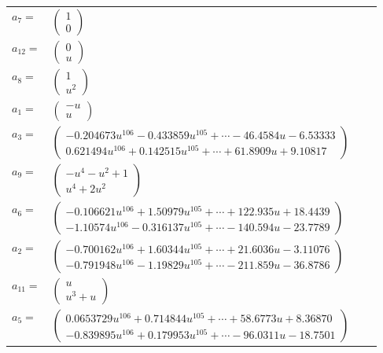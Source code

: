 \documentclass[1p]{elsarticle_modified}
\theoremstyle{definition}
\begin{document}
\begin{tabular}{m{7pt} m{180pt} m{7pt} m{180pt} }
\flushright $a_{7}=$&$\begin{pmatrix}1\\0\end{pmatrix}$ \\
\flushright $a_{12}=$&$\begin{pmatrix}0\\u\end{pmatrix}$ \\
\flushright $a_{8}=$&$\begin{pmatrix}1\\u^2\end{pmatrix}$ \\
\flushright $a_{1}=$&$\begin{pmatrix}- u\\u\end{pmatrix}$ \\
\flushright $a_{3}=$&$\begin{pmatrix}-0.204673 u^{106}-0.433859 u^{105}+\cdots-46.4584 u-6.53333\\0.621494 u^{106}+0.142515 u^{105}+\cdots+61.8909 u+9.10817\end{pmatrix}$ \\
\flushright $a_{9}=$&$\begin{pmatrix}- u^4- u^2+1\\u^4+2 u^2\end{pmatrix}$ \\
\flushright $a_{6}=$&$\begin{pmatrix}-0.106621 u^{106}+1.50979 u^{105}+\cdots+122.935 u+18.4439\\-1.10574 u^{106}-0.316137 u^{105}+\cdots-140.594 u-23.7789\end{pmatrix}$ \\
\flushright $a_{2}=$&$\begin{pmatrix}-0.700162 u^{106}+1.60344 u^{105}+\cdots+21.6036 u-3.11076\\-0.791948 u^{106}-1.19829 u^{105}+\cdots-211.859 u-36.8786\end{pmatrix}$ \\
\flushright $a_{11}=$&$\begin{pmatrix}u\\u^3+u\end{pmatrix}$ \\
\flushright $a_{5}=$&$\begin{pmatrix}0.0653729 u^{106}+0.714844 u^{105}+\cdots+58.6773 u+8.36870\\-0.839895 u^{106}+0.179953 u^{105}+\cdots-96.0311 u-18.7501\end{pmatrix}$ \\

\end{tabular}
\end{document}
